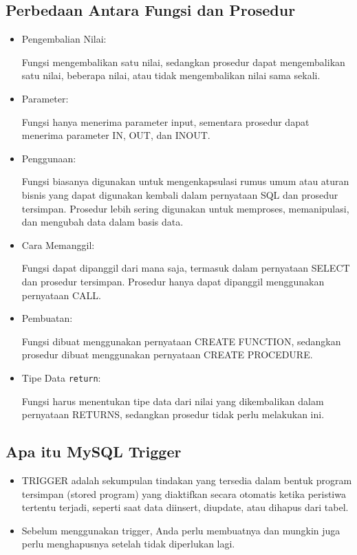 \documentclass{article}
\begin{document}
\subsection{Perbedaan Antara Fungsi dan Prosedur}
\begin{itemize}
    \item Pengembalian Nilai:

          Fungsi mengembalikan satu nilai, sedangkan prosedur dapat mengembalikan satu nilai, beberapa nilai, atau tidak mengembalikan nilai sama sekali.
    \item Parameter:

          Fungsi hanya menerima parameter input, sementara prosedur dapat menerima parameter IN, OUT, dan INOUT.
    \item Penggunaan:

          Fungsi biasanya digunakan untuk mengenkapsulasi rumus umum atau aturan bisnis yang dapat digunakan kembali dalam pernyataan SQL dan prosedur tersimpan. Prosedur lebih sering digunakan untuk memproses, memanipulasi, dan mengubah data dalam basis data.
    \item Cara Memanggil:

          Fungsi dapat dipanggil dari mana saja, termasuk dalam pernyataan SELECT dan prosedur tersimpan. Prosedur hanya dapat dipanggil menggunakan pernyataan CALL.
    \item Pembuatan:

          Fungsi dibuat menggunakan pernyataan CREATE FUNCTION, sedangkan prosedur dibuat menggunakan pernyataan CREATE PROCEDURE.
    \item Tipe Data \verb|return|:

          Fungsi harus menentukan tipe data dari nilai yang dikembalikan dalam pernyataan RETURNS, sedangkan prosedur tidak perlu melakukan ini.
\end{itemize}

\subsection{Apa itu MySQL Trigger}
\begin{itemize}
    \item TRIGGER adalah sekumpulan tindakan yang tersedia dalam bentuk program tersimpan (stored program) yang diaktifkan secara otomatis ketika peristiwa tertentu terjadi, seperti saat data diinsert, diupdate, atau dihapus dari tabel.
    \item Sebelum menggunakan trigger, Anda perlu membuatnya dan mungkin juga perlu menghapusnya setelah tidak diperlukan lagi.
\end{itemize}
\end{document}
